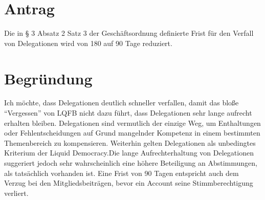 \section{Antrag}

Die in § 3 Absatz 2 Satz 3 der Geschäftsordnung definierte Frist für den Verfall von Delegationen wird von 180 auf 90 Tage reduziert.

\section{Begründung}

Ich möchte, dass Delegationen deutlich schneller verfallen, damit das bloße ``Vergessen'' von LQFB nicht dazu führt, dass Delegationen sehr lange aufrecht erhalten bleiben. Delegationen sind vermutlich der einzige Weg, um Enthaltungen oder Fehlentscheidungen auf Grund mangelnder Kompetenz in einem bestimmten Themenbereich zu kompensieren. Weiterhin gelten Delegationen als unbedingtes Kriterium der Liquid Democracy.Die lange Aufrechterhaltung von Delegationen suggeriert jedoch sehr wahrscheinlich eine höhere Beteiligung an Abstimmungen, als tatsächlich vorhanden ist. Eine Frist von 90 Tagen entspricht auch dem Verzug bei den Mitgliedsbeiträgen, bevor ein Account seine Stimmberechtigung verliert.
